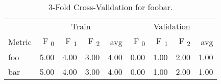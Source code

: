 \begin{table}[ht]
  \centering
  \caption{ 3-Fold Cross-Validation for foobar.}
  \begin{tabular}{lrrrrrrrr}
    \toprule
    & \multicolumn{ 4 }{c}{Train}
    & \multicolumn{ 4 }{c}{Validation}
    \\
    \cmidrule(l){ 2-5}
    \cmidrule(lr){ 6-9}
    Metric
     & F\textsubscript{ 0 } & F\textsubscript{ 1 } & F\textsubscript{ 2 } & avg %
     & F\textsubscript{ 0 } & F\textsubscript{ 1 } & F\textsubscript{ 2 } & avg %
    \\
    \midrule
      foo
      & 5.00& 4.00& 3.00
      & 4.00
      & 0.00& 1.00& 2.00
      & 1.00
      \\
      bar
      & 5.00& 4.00& 3.00
      & 4.00
      & 0.00& 1.00& 2.00
      & 1.00
      \\
    \bottomrule
  \end{tabular}
\end{table}
